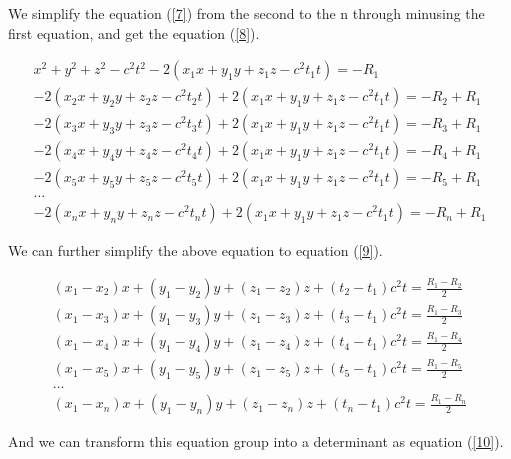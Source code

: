 \documentclass[runningheads,a4paper]{llncs}
\begin{document}
	We simplify the equation (\ref{7}) from the second to the n through minusing the first equation, and get the equation (\ref{8}).
	
	\begin{equation}
	\begin{split}
	\label{8}
	x^2+y^2+z^2-c^2t^2-2(x_1x+y_1y+z_1z-c^2t_1t)=-R_1\\
	-2(x_2x+y_2y+z_2z-c^2t_2t)+2(x_1x+y_1y+z_1z-c^2t_1t)=-R_2+R_1\\
	-2(x_3x+y_3y+z_3z-c^2t_3t)+2(x_1x+y_1y+z_1z-c^2t_1t)=-R_3+R_1\\
	-2(x_4x+y_4y+z_4z-c^2t_4t)+2(x_1x+y_1y+z_1z-c^2t_1t)=-R_4+R_1\\
	-2(x_5x+y_5y+z_5z-c^2t_5t)+2(x_1x+y_1y+z_1z-c^2t_1t)=-R_5+R_1\\
	\dots\\
	-2(x_nx+y_ny+z_nz-c^2t_nt)+2(x_1x+y_1y+z_1z-c^2t_1t)=-R_n+R_1
	\end{split}
	\end{equation}
	
	We can further simplify the above equation to equation (\ref{9}).

	\begin{equation}
	\begin{split}
	\label{9}
	(x_1-x_2)x+(y_1-y_2)y+(z_1-z_2)z+(t_2-t_1)c^2t=\frac{R_1-R_2}{2}\\
	(x_1-x_3)x+(y_1-y_3)y+(z_1-z_3)z+(t_3-t_1)c^2t=\frac{R_1-R_3}{2}\\
	(x_1-x_4)x+(y_1-y_4)y+(z_1-z_4)z+(t_4-t_1)c^2t=\frac{R_1-R_4}{2}\\
	(x_1-x_5)x+(y_1-y_5)y+(z_1-z_5)z+(t_5-t_1)c^2t=\frac{R_1-R_5}{2}\\
	\dots\\
	(x_1-x_n)x+(y_1-y_n)y+(z_1-z_n)z+(t_n-t_1)c^2t=\frac{R_1-R_n}{2}
	\end{split}
	\end{equation}
	
	And we can transform this equation group into a determinant as equation (\ref{10}).
	
\end{document}
